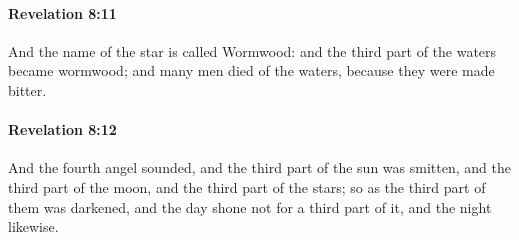		\paragraph{Revelation 8:11} %
			\label{REVELATIONNT-8-11}

			And the name of the star is called Wormwood: and the third part of the waters became wormwood; and many men died of the waters, because they were made bitter.

			\begin{framed}
			\scriptsize
				\begin{compactdesc}
					\item[SBLG] 
				\end{compactdesc}
			\end{framed}

		\paragraph{Revelation 8:12} %
			\label{REVELATIONNT-8-12}

			And the fourth angel sounded, and the third part of the sun was smitten, and the third part of the moon, and the third part of the stars; so as the third part of them was darkened, and the day shone not for a third part of it, and the night likewise.

